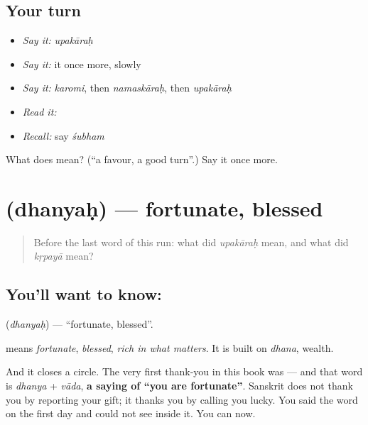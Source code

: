 \subsection*{Your turn}
\begin{itemize}
\raggedright
  \item \emph{Say it:} \emph{upakāraḥ}
  \item \emph{Say it:} it once more, slowly
  \item \emph{Say it:} \emph{karomi}, then \emph{namaskāraḥ}, then \emph{upakāraḥ}
  \item \emph{Read it:} \textbf{}
  \item \emph{Recall:} say \emph{śubham}
\end{itemize}

\begin{tcolorbox}[breakable,colback=teal!4,colframe=teal!35!black,title={Before you move on}]
What does  mean? (\textquotedblleft{}a favour, a good turn\textquotedblright{}.) Say it once more.
\end{tcolorbox}
\section[\texorpdfstring{\sk{धन्यः} (dhanyaḥ)}{धन्यः (dhanyaḥ)}]{ (dhanyaḥ) — fortunate, blessed}

\label{lesson:SA-C29-fortunate}



\begin{quote}
Before the last word of this run: what did \emph{upakāraḥ} mean, and what did \emph{kṛpayā} mean?
\end{quote}

\subsection*{You'll want to know: }
\textbf{} (\emph{dhanyaḥ}) — \textquotedblleft{}fortunate, blessed\textquotedblright{}.

\textbf{} means \emph{fortunate}, \emph{blessed}, \emph{rich in what matters}. It is built on \emph{dhana}, wealth.

And it closes a circle. The very first thank-you in this book was \textbf{} — and that word is \emph{dhanya} + \emph{vāda}, \textbf{a saying of \textquotedblleft{}you are fortunate\textquotedblright{}}. Sanskrit does not thank you by reporting your gift; it thanks you by calling you lucky. You said the word on the first day and could not see inside it. You can now.

